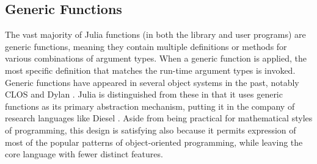 \documentclass[9pt]{sigplanconf}
\begin{document}









\subsection{Generic Functions}


The vast majority of Julia functions (in both the library and user programs)
are generic functions, meaning they contain multiple definitions or methods for
various combinations of argument types. When a generic function is applied,
the most specific definition that matches the run-time argument types is
invoked. Generic functions have appeared in several object systems in the past,
notably CLOS \cite{closoverview} and Dylan \cite{dylanlang}.
Julia is distinguished from these in that
it uses generic functions as its primary abstraction mechanism, putting it in
the company of research languages like Diesel \cite{dieselspec}. Aside
from being practical for mathematical styles of programming,
this design is satisfying also because it permits
expression of most of the popular patterns of object-oriented programming,
while leaving the core language with fewer distinct features.
\end{document}
